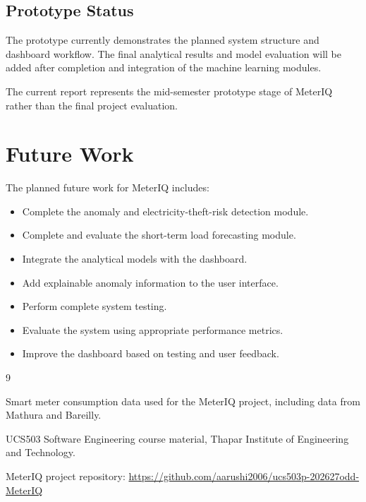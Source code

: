 \documentclass[12pt,a4paper]{report}
\begin{document}
\section{Prototype Status}

The prototype currently demonstrates the planned system structure and
dashboard workflow. The final analytical results and model evaluation will
be added after completion and integration of the machine learning modules.

The current report represents the mid-semester prototype stage of MeterIQ
rather than the final project evaluation.



\chapter{Future Work}

The planned future work for MeterIQ includes:

\begin{itemize}
    \item Complete the anomaly and electricity-theft-risk detection module.
    \item Complete and evaluate the short-term load forecasting module.
    \item Integrate the analytical models with the dashboard.
    \item Add explainable anomaly information to the user interface.
    \item Perform complete system testing.
    \item Evaluate the system using appropriate performance metrics.
    \item Improve the dashboard based on testing and user feedback.
\end{itemize}



\begin{thebibliography}{9}

Smart meter consumption data used for the MeterIQ project,
including data from Mathura and Bareilly.

UCS503 Software Engineering course material,
Thapar Institute of Engineering and Technology.

MeterIQ project repository:
\url{https://github.com/aarushi2006/ucs503p-202627odd-MeterIQ}

\end{thebibliography}


\end{document}
